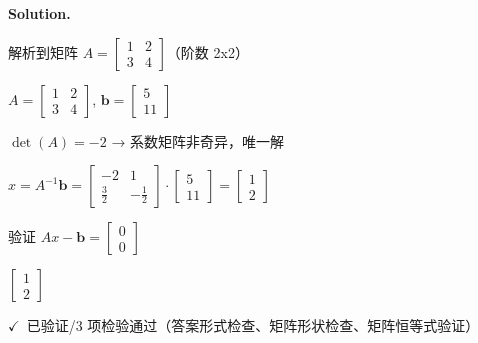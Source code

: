 \documentclass[12pt, a4paper]{article}
\newcommand{\solution}{%
  \par\noindent
  {\color{solutiongreen}\bfseries Solution.}\par
}
\newcommand{\verifyok}{\textcolor{solutiongreen}{\ensuremath{\checkmark}\ 已验证}}
\begin{document}
\solution

\begin{stepbox}
解析到矩阵 $A = \left[\begin{matrix}1 & 2\\3 & 4\end{matrix}\right]$（阶数 2x2）
\end{stepbox}

\begin{stepbox}
$A = \left[\begin{matrix}1 & 2\\3 & 4\end{matrix}\right]$, $\mathbf{b} = \left[\begin{matrix}5\\11\end{matrix}\right]$
\end{stepbox}

\begin{stepbox}
$\det(A) = -2$ → 系数矩阵非奇异，唯一解
\end{stepbox}

\begin{stepbox}
$x = A^{-1}\mathbf{b} = \left[\begin{matrix}-2 & 1\\\frac{3}{2} & - \frac{1}{2}\end{matrix}\right] \cdot \left[\begin{matrix}5\\11\end{matrix}\right] = \left[\begin{matrix}1\\2\end{matrix}\right]$
\end{stepbox}

\begin{stepbox}
验证 $Ax - \mathbf{b} = \left[\begin{matrix}0\\0\end{matrix}\right]$
\end{stepbox}

\begin{center}
$\boxed{\left[\begin{matrix}1\\2\end{matrix}\right]}$
\end{center}

\begin{verifybox}\small \verifyok{}/3 项检验通过（答案形式检查、矩阵形状检查、矩阵恒等式验证） \end{verifybox}
\end{document}
